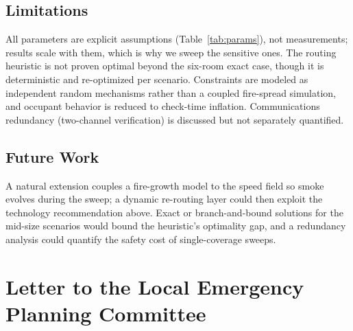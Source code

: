 \documentclass{mcmthesis}
\begin{document}
\subsection{Limitations}
All parameters are explicit assumptions (Table~\ref{tab:params}), not measurements; results scale with them, which is why we sweep the sensitive ones. The routing heuristic is not proven optimal beyond the six-room exact case, though it is deterministic and re-optimized per scenario. Constraints are modeled as independent random mechanisms rather than a coupled fire-spread simulation, and occupant behavior is reduced to check-time inflation. Communications redundancy (two-channel verification) is discussed but not separately quantified.

\subsection{Future Work}
A natural extension couples a fire-growth model to the speed field so smoke evolves during the sweep; a dynamic re-routing layer could then exploit the technology recommendation above. Exact or branch-and-bound solutions for the mid-size scenarios would bound the heuristic's optimality gap, and a redundancy analysis could quantify the safety cost of single-coverage sweeps.

\section*{Letter to the Local Emergency Planning Committee}
\end{document}

